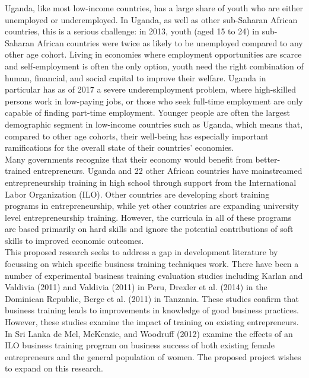 Uganda, like most low-income countries, has a large share of youth who are either unemployed or underemployed. In Uganda, as well as other sub-Saharan African countries, this is a serious challenge: in 2013, youth (aged 15 to 24) in sub-Saharan African countries were twice as likely to be unemployed compared to any other age cohort\cite{brookings}. Living in economies where employment opportunities are scarce and self-employment is often the only option, youth need the right combination of human, financial, and social capital to improve their welfare. Uganda in particular has as of 2017 a severe underemployment problem, where high-skilled persons work in low-paying jobs, or those who seek full-time employment are only capable of finding part-time employment\cite{eprc}. Younger people are often the largest demographic segment in low-income countries such as Uganda, which means that, compared to other age cohorts, their well-being has especially important ramifications for the overall state of their countries' economies.\\

Many governments recognize that their economy would benefit from better-trained entrepreneurs. Uganda and 22 other African countries have mainstreamed entrepreneurship training in high school through support from the International Labor Organization (ILO). Other countries are developing short training programs in entrepreneurship, while yet other countries are expanding university level entrepreneurship training. However, the curricula in all of these programs are based primarily on hard skills and ignore the potential contributions of soft skills to improved economic outcomes.\\

This proposed research seeks to address a gap in development literature by focussing on which specific business training techniques work. There have been a number of experimental business training evaluation studies including Karlan and Valdivia (2011)\cite{karlanAndValdivia2011} and Valdivia (2011)\cite{valdivia2011} in Peru, Drexler et al. (2014)\cite{drexler2014} in the Dominican Republic, Berge et al. (2011)\cite{berge2011} in Tanzania. These studies confirm that business training leads to improvements in knowledge of good business practices. However, these studies examine the impact of training on existing entrepreneurs. In Sri Lanka de Mel, McKenzie, and Woodruff (2012)\cite{deMelEtAl2012} examine the effects of an ILO business training program on business success of both existing female entrepreneurs and the general population of women. The proposed project wishes to expand on this research. \\

